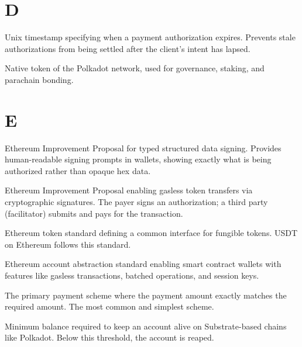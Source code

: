 \section*{D}

\begin{description}[style=nextline]

\item[Deadline]
Unix timestamp specifying when a payment authorization expires. Prevents stale authorizations from being settled after the client's intent has lapsed.

\item[DOT]
Native token of the Polkadot network, used for governance, staking, and parachain bonding.

\end{description}

\section*{E}

\begin{description}[style=nextline]

\item[EIP-712]
Ethereum Improvement Proposal for typed structured data signing. Provides human-readable signing prompts in wallets, showing exactly what is being authorized rather than opaque hex data.

\item[EIP-3009]
Ethereum Improvement Proposal enabling gasless token transfers via cryptographic signatures. The payer signs an authorization; a third party (facilitator) submits and pays for the transaction.

\item[ERC-20]
Ethereum token standard defining a common interface for fungible tokens. USDT on Ethereum follows this standard.

\item[ERC-4337]
Ethereum account abstraction standard enabling smart contract wallets with features like gasless transactions, batched operations, and session keys.

\item[Exact Scheme]
The primary \tprotocol{} payment scheme where the payment amount exactly matches the required amount. The most common and simplest scheme.

\item[Existential Deposit]
Minimum balance required to keep an account alive on Substrate-based chains like Polkadot. Below this threshold, the account is reaped.

\end{description}

